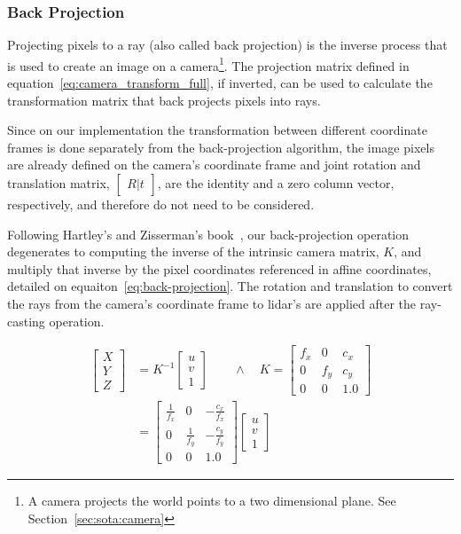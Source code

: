 \subsubsection{Back Projection}
Projecting pixels to a ray (also called back projection) is the inverse process that is used to create an image on a camera\footnote{A camera projects the world points to a two dimensional plane. See Section~\ref{sec:sota:camera}}. The projection matrix defined in equation~\ref{eq:camera_transform_full}, if inverted, can be used to calculate the transformation matrix that  back projects pixels into rays.

Since on our implementation the transformation between different coordinate frames is done separately from the back-projection algorithm, the image pixels are already defined on the camera's coordinate frame and joint rotation and translation matrix, $\begin{bmatrix} R|t \end{bmatrix}$, are the identity and a zero column vector, respectively, and therefore do not need to be considered.

Following Hartley's and Zisserman's book~\cite{mvg_book}, our back-projection operation degenerates to computing the inverse of the intrinsic camera matrix, $K$, and multiply that inverse by the pixel coordinates referenced in affine coordinates, detailed on equaiton~\ref{eq:back-projection}. The rotation and translation to convert the rays from the camera's coordinate frame to \ac{lidar}'s are applied after the ray-casting operation.


\begin{align}
	\label{eq:back-projection}
	\begin{bmatrix}
		X \\
		Y \\
		Z
	\end{bmatrix}
	 & = K^{-1} 
	\begin{bmatrix}
		u \\
		v \\
		1
	\end{bmatrix}
\qquad \wedge \quad
	K = 
	\begin{bmatrix}
		f_x & 0 & c_x \\
		0 & f_y & c_y \\
		0 & 0 & 1.0
	\end{bmatrix}
\nonumber \\	 
	&  = 
	\begin{bmatrix}
	\frac{1}{f_x} & 0 & -\frac{c_x}{f_x} \\
	0 & \frac{1}{f_y}  & -\frac{c_y}{f_y} \\
	0 & 0 & 1.0 
	\end{bmatrix}
	\begin{bmatrix}
		u \\
		v \\
		1
	\end{bmatrix}
\end{align}

